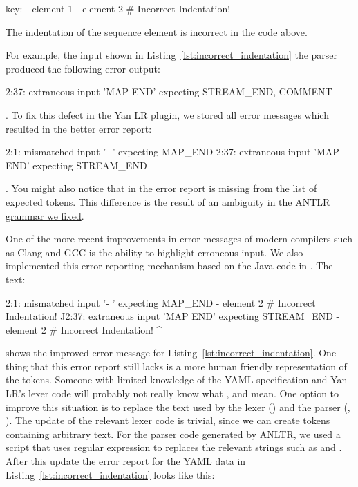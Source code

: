 \begin{listing}
  \begin{yamlcode}
    key: - element 1
      - element 2 # Incorrect Indentation!
  \end{yamlcode}
  \caption{The indentation of the sequence element  is incorrect in the code above.}
  \label{lst:incorrect_indentation}
\end{listing}

For example, the input shown in Listing~\ref{lst:incorrect_indentation} the parser produced the following error output:

\begin{textcode}
  2:37: extraneous input 'MAP END' expecting {STREAM_END, COMMENT}
\end{textcode}

. To fix this defect in the Yan LR plugin, we stored all error messages which resulted in the better error report:

\begin{textcode}
  2:1: mismatched input '- ' expecting MAP_END
  2:37: extraneous input 'MAP END' expecting STREAM_END
\end{textcode}

. You might also notice that in the error report  is missing from the list of expected tokens. This difference is the result of an \href{https://github.com/ElektraInitiative/libelektra/commit/0fe4953}{ambiguity in the ANTLR grammar we fixed}.

One of the more recent improvements in error messages of modern compilers such as Clang and GCC is the ability to highlight erroneous input. We also implemented this error reporting mechanism based on the Java code in . The text:

\begin{textcode}
2:1: mismatched input '- ' expecting MAP_END
     - element 2 # Incorrect Indentation!
     ^^
2:37: extraneous input 'MAP END' expecting STREAM_END
      - element 2 # Incorrect Indentation!
                                          ^
\end{textcode}

shows the improved error message for Listing~\ref{lst:incorrect_indentation}. One thing that this error report still lacks is a more human friendly representation of the tokens. Someone with limited knowledge of the YAML specification and Yan LR’s lexer code will probably not really know what ,  and  mean. One option to improve this situation is to replace the text used by the lexer () and the parser (, ). The update of the relevant lexer code is trivial, since we can create tokens containing arbitrary text. For the parser code generated by ANLTR, we used a script that uses regular expression to replaces the relevant strings such as  and . After this update the error report for the YAML data in Listing~\ref{lst:incorrect_indentation} looks like this:

